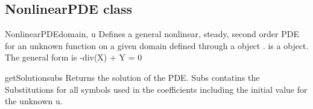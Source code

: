 \subsection{NonlinearPDE class}
\begin{classdesc}{NonlinearPDE}{domain, u}
Defines a general nonlinear, steady, second order PDE for an unknown function  on a given domain defined through a \Domain object .  is a \SYMBOL object.
The general form is -div(X) + Y = 0 
\end{classdesc}
\iffalse
\begin{methoddesc}[NonlinearPDE]{concatenateRow}{}
test
\end{methoddesc}
\begin{methoddesc}[NonlinearPDE]{createCoefficient}{}
test
\end{methoddesc}
\begin{methoddesc}[NonlinearPDE]{getUnknownSymbol}{}
test
\end{methoddesc}
\begin{methoddesc}[NonlinearPDE]{getLinearSolverOptions}{}
test
\end{methoddesc}
\begin{methoddesc}[NonlinearPDE]{getLinearPDE}{}
test
\end{methoddesc}
\begin{methoddesc}[NonlinearPDE]{getNumSolutions}{}
test
\end{methoddesc}
\begin{methoddesc}[NonlinearPDE]{getShapeOfCoefficient}{}
test
\end{methoddesc}
\begin{methoddesc}[NonlinearPDE]{getCoefficient}{}
test
\end{methoddesc}
\begin{methoddesc}[NonlinearPDE]{getSensitivity}{}
test
\end{methoddesc}
\fi
\begin{methoddesc}[NonlinearPDE]{getSolution}{subs}
Returns the solution of the PDE. Subs contatins the Substitutions for all symbols used in the coefficients including the initial value for the unknown u.
\end{methoddesc}
